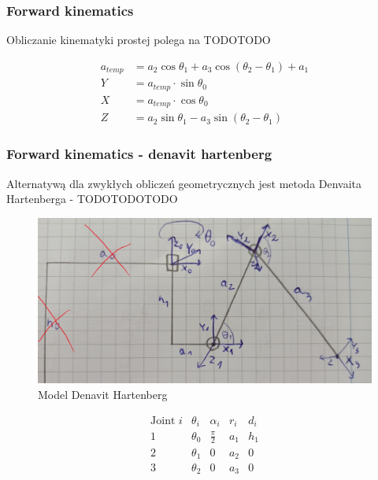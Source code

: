 \documentclass[a4paper,13pt]{article}
\begin{document}
\subsubsection{Forward kinematics}
Obliczanie kinematyki prostej polega na TODOTODO

\begin{equation} \label{FK_ver_1}
\begin{split}
a_{temp} &= a_2 \cos{\theta_1} + a_3 \cos{\left(\theta_2 - \theta_1\right)} + a_1\\
Y &= a_{temp} \cdot \sin{\theta_0}\\
X &= a_{temp} \cdot \cos{\theta_0}\\
Z &= a_2 \sin{\theta_1} - a_3 \sin{\left(\theta_2 - \theta_1\right)}
\end{split}
\end{equation}

\subsubsection{Forward kinematics - denavit hartenberg \cite{DH_AA_article}}
Alternatywą dla zwykłych obliczeń geometrycznych jest metoda Denvaita Hartenberga - TODOTODOTODO

\begin{figure}[H]
\includegraphics[width=\textwidth]{img/DH_model.jpg}
\caption{Model Denavit Hartenberg}
\label{math_model}
\end{figure}

\begin{equation}
\begin{array}{c|cccc}
\textrm{Joint } i & \theta_i & \alpha_i & r_i & d_i \\
\hline
1  & \theta_0 & \frac{\pi}{2} & a_1 & h_1 \\
2  & \theta_1 & 0 & a_2 & 0 \\
3  & \theta_2 & 0 & a_3 & 0 \\
\end{array}
\end{equation}
\end{document}
